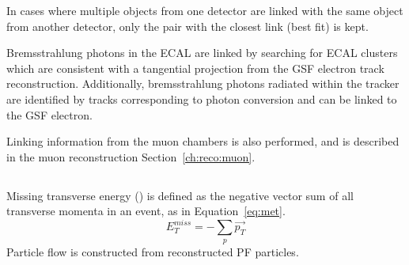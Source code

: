 In cases where multiple objects from one detector are linked with the same object from another detector, only the pair with the closest link (best fit) is kept. 

Bremsstrahlung photons in the ECAL are linked by searching for ECAL clusters which are consistent with a tangential projection from the GSF electron track reconstruction. Additionally, bremsstrahlung photons radiated within the tracker are identified by tracks corresponding to photon conversion and can be linked to the GSF electron. 

Linking information from the muon chambers is also performed, and is described in the muon reconstruction Section~\ref{ch:reco:muon}.


\subsection{\met}
Missing transverse energy (\met) is defined as the negative vector sum of all transverse momenta in an event, as in Equation~\ref{eq:met}.
\begin{equation}
    E_T^{miss}=-\sum_{p} \vec{p_T}
    \label{eq:met}
\end{equation}
Particle flow \met is constructed from reconstructed PF particles.
